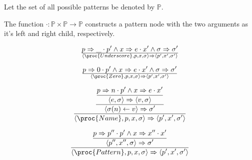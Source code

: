 \begin{definition}

Let the set of all possible patterns be denoted by $\mathbb{P}$.

\end{definition}

\begin{definition}

The function $\cdot
:\mathbb{P}\times\mathbb{P}\rightarrow\mathbb{P}$ constructs a pattern node with the
two arguments as it's left and right child, respectively. 

\end{definition}

\begin{equation}
{
    p\Rightarrow \_\cdot p'
  \wedge
    x\Rightarrow e\cdot x'
  \wedge
    \sigma\Rightarrow\sigma'
}\over{
  \left\langle\proc{Underscore}, p,x,\sigma\right\rangle
  \Rightarrow
  \left\langle p',x',\sigma'\right\rangle
}
\end{equation}

\begin{equation}
{
    p\Rightarrow 0\cdot p'
  \wedge
    x\Rightarrow e\cdot x'
  \wedge
    \sigma\Rightarrow\sigma'
}\over{
  \left\langle\proc{Zero}, p,x,\sigma\right\rangle
  \Rightarrow
  \left\langle p',x',\sigma'\right\rangle
}
\end{equation}


\begin{equation}
{\displaystyle
{\displaystyle
{\displaystyle
    p\Rightarrow n\cdot p'
  \wedge
    x\Rightarrow e\cdot x'
\over\displaystyle
    \left\langle e,\sigma\right\rangle
    \Rightarrow
    \left\langle v,\sigma\right\rangle
}\over\displaystyle
    \left\langle\sigma(n)\leftarrow v\right\rangle
    \Rightarrow
    \sigma'
}\over\displaystyle
  \left\langle\proc{Name}, p,x,\sigma\right\rangle
  \Rightarrow
  \left\langle p',x',\sigma'\right\rangle
}
\end{equation}

\begin{equation}
{\displaystyle
{\displaystyle
    p\Rightarrow p''\cdot p'  
  \wedge
    x\Rightarrow x''\cdot x'
\over\displaystyle
  \left\langle p'', x'', \sigma\right\rangle
  \Rightarrow
  \sigma'
}
\over\displaystyle
  \left\langle\proc{Pattern}, p,x,\sigma\right\rangle
  \Rightarrow
  \left\langle p',x',\sigma'\right\rangle
}
\end{equation}
